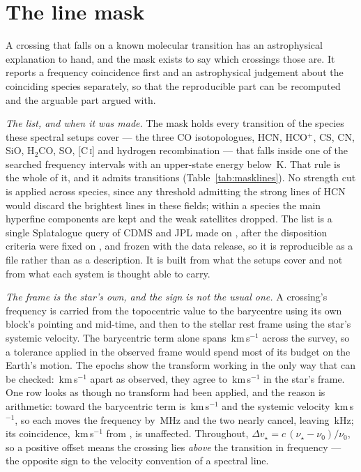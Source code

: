 \section{The line mask}
\label{app:linemask}

A crossing that falls on a known molecular transition has an astrophysical
explanation to hand, and the mask exists to say which crossings those are. It
reports a frequency coincidence first and an astrophysical judgement about
the coinciding species separately, so that the reproducible part can be
recomputed and the arguable part argued with.

\emph{The list, and when it was made.} The mask holds every transition of the
\FrNSpec{} species these spectral setups cover --- the three CO isotopologues,
HCN, HCO$^{+}$, CS, CN, SiO, H$_2$CO, SO, [C\,\textsc{i}] and hydrogen
recombination --- that falls inside one of the \McNIsland{} searched frequency
intervals with an upper-state energy below \McEuMax\,K. That rule is the whole
of it, and it admits \FrNTrans{} transitions (Table~\ref{tab:masklines}).
No strength cut is applied across species, since any threshold admitting the
strong lines of HCN would discard the brightest lines in these fields; within
a species the main hyperfine components are kept and the weak satellites
dropped. The list is a single Splatalogue query of CDMS and
JPL \citep{Pickett1998,CDMS2005} made on \MkListDate{}, after the disposition
criteria were fixed on \MkCritDate, and frozen with the data release, so it
is reproducible as a file rather than as a description. It is built from what
the setups cover and not from what each system is thought able to carry.

\emph{The frame is the star's own, and the sign is not the usual one.} A
crossing's frequency is carried from the topocentric value to the barycentre
using its own block's pointing and mid-time, and then to the stellar rest
frame using the star's systemic velocity. The barycentric term alone spans
\FrBarySwing\,km\,s$^{-1}$ across the survey, so a tolerance applied in the
observed frame would spend most of its budget on the Earth's motion. The
\FrEpochNEpoch{} \FrEpochStar{} epochs show
the transform working in the only way that can be checked:
\FrEpochTopoKms\,km\,s$^{-1}$ apart as observed, they agree to
\FrEpochStelKms\,km\,s$^{-1}$ in the star's frame. One row looks as though no
transform had been applied, and the reason is arithmetic: toward
\MkCancStar{} the barycentric term is \MkCancVBary\,km\,s$^{-1}$ and the
systemic velocity \MkCancVSys\,km\,s$^{-1}$, so each moves the frequency by
\MkCancBaryMHz\,MHz and the two nearly cancel, leaving \MkCancNetkHz\,kHz;
its coincidence, \MkCancDv\,km\,s$^{-1}$ from \MkCancLine, is unaffected.
Throughout, $\Delta v_\star = c\,(\nu_\star-\nu_0)/\nu_0$, so a positive
offset means the crossing lies \emph{above} the transition in frequency ---
the opposite sign to the velocity convention of a spectral line.

